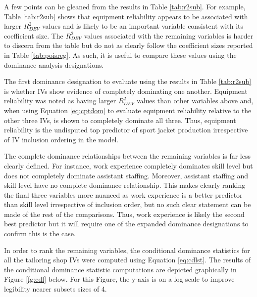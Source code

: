 \documentclass[doc]{apa7}
\begin{document}
	A few points can be gleaned from the results in Table \ref{tab:r2sub}. 
	For example, Table \ref{tab:r2sub} shows that equipment reliability appears to be associated with larger $R^2_{DEV}$ values and is likely to be an important variable consistent with its coefficient size. 
	The $R^2_{DEV}$ values associated with the remaining variables is harder to discern from the table but do not as clearly follow the coefficient sizes reported in Table \ref{tab:poisreg}.
	As such, it is useful to compare these values using the dominance analysis designations.
	
	The first dominance designation to evaluate using the results in Table \ref{tab:r2sub} is whether IVs show evidence of completely dominating one another.
	Equipment reliability was noted as having larger $R^2_{DEV}$ values than other variables above and, when using Equation \ref{eq:cptdom} to evaluate equipment reliability relative to the other three IVs, is shown to completely dominate all three.
	Thus, equipment reliability is the undisputed top predictor of sport jacket production irrespective of IV inclusion ordering in the model.	
	
	The complete dominance relationships between the remaining variables is far less clearly defined. 
	For instance, work experience completely dominates skill level but does not completely dominate assistant staffing.
	Moreover, assistant staffing and skill level have no complete dominance relationship.
	This makes clearly ranking the final three variables more nuanced as work experience is a better predictor than skill level irrespective of inclusion order, but no such clear statement can be made of the rest of the comparisons.
	Thus, work experience is likely the second best predictor but it will require one of the expanded dominance designations to confirm this is the case.
	
	In order to rank the remaining variables, the conditional dominance statistics for all the tailoring shop IVs were computed using Equation \ref{eq:cdlst}.
	The results of the conditional dominance statistic computations are depicted graphically in Figure \ref{fg:cdl} below.
	For this Figure, the y-axis is on a log scale to improve legibility nearer subsets sizes of 4.
	
\end{document}
